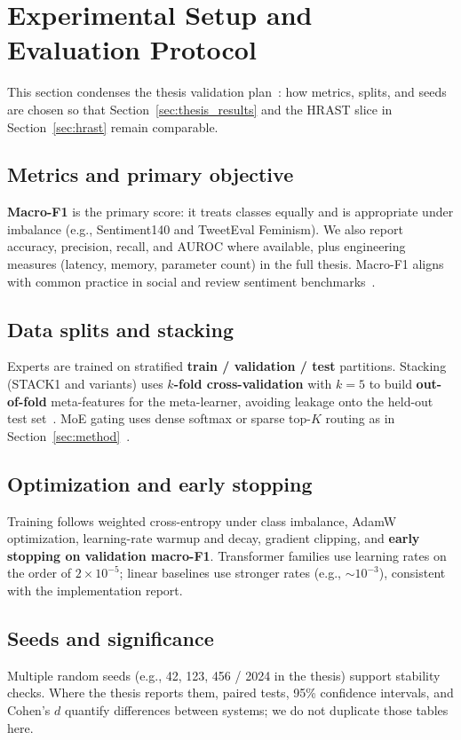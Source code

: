 \section{Experimental Setup and Evaluation Protocol}
\label{sec:exp_setup}

This section condenses the thesis validation plan~\cite{ref16,ref17,ref22}: how metrics, splits, and seeds are chosen so that Section~\ref{sec:thesis_results} and the HRAST slice in Section~\ref{sec:hrast} remain comparable.

\subsection{Metrics and primary objective}
\textbf{Macro-F1} is the primary score: it treats classes equally and is appropriate under imbalance (e.g., Sentiment140 and TweetEval Feminism). We also report accuracy, precision, recall, and AUROC where available, plus engineering measures (latency, memory, parameter count) in the full thesis. Macro-F1 aligns with common practice in social and review sentiment benchmarks~\cite{ref14,ref15}.

\subsection{Data splits and stacking}
Experts are trained on stratified \textbf{train / validation / test} partitions. Stacking (STACK1 and variants) uses \textbf{$k$-fold cross-validation} with $k=5$ to build \textbf{out-of-fold} meta-features for the meta-learner, avoiding leakage onto the held-out test set~\cite{ref16,ref17}. MoE gating uses dense softmax or sparse top-$K$ routing as in Section~\ref{sec:method}~\cite{ref26,ref27,ref28,ref29}.

\subsection{Optimization and early stopping}
Training follows weighted cross-entropy under class imbalance, AdamW optimization, learning-rate warmup and decay, gradient clipping, and \textbf{early stopping on validation macro-F1}. Transformer families use learning rates on the order of $2\times10^{-5}$; linear baselines use stronger rates (e.g., $\sim\!10^{-3}$), consistent with the implementation report.

\subsection{Seeds and significance}
Multiple random seeds (e.g., 42, 123, 456 / 2024 in the thesis) support stability checks. Where the thesis reports them, paired tests, 95\% confidence intervals, and Cohen's $d$ quantify differences between systems; we do not duplicate those tables here.

